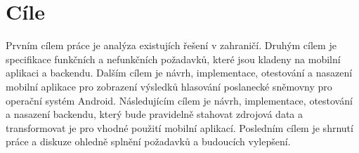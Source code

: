 \chapter{Cíle}

\setcounter{page}{1}

Prvním cílem práce je analýza existujích řešení v zahraničí. Druhým cílem je specifikace funkčních a nefunkčních požadavků, které jsou kladeny na mobilní aplikaci a backendu. Dalším cílem je návrh, implementace, otestování a nasazení mobilní aplikace pro zobrazení výsledků hlasování poslanecké sněmovny pro operační systém Android. Následujícím cílem je návrh, implementace, otestování a nasazení backendu, který bude pravidelně stahovat zdrojová data a transformovat je pro vhodné použití mobilní aplikací. Posledním cílem je shrnutí práce a diskuze ohledně splnění požadavků a budoucích vylepšení.